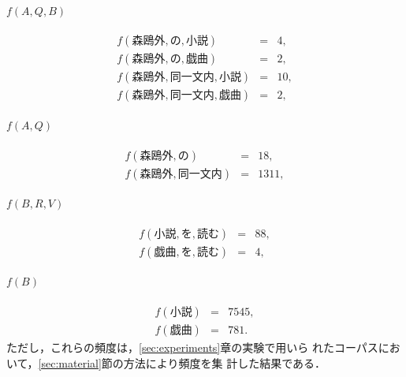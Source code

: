 \paragraph{$f(A,Q,B)$}
\begin{eqnarray}
  f(森鴎外,の,小説) & = & 4, \nonumber\\
  f(森鴎外,の,戯曲) & = & 2, \nonumber\\
  f(森鴎外,同一文内,小説) & = & 10, \nonumber\\
  f(森鴎外,同一文内,戯曲) & = & 2, \nonumber
\end{eqnarray}
\paragraph{$f(A,Q)$}
\begin{eqnarray}
  f(森鴎外,の) & = & 18, \nonumber\\
  f(森鴎外,同一文内) & = & 1311,\nonumber
\end{eqnarray}
\paragraph{$f(B,R,V)$}
\begin{eqnarray}
  f(小説,を,読む) & = & 88, \nonumber\\
  f(戯曲,を,読む) & = & 4, \nonumber
\end{eqnarray}
\paragraph{$f(B)$}
\begin{eqnarray}
  f(小説) & = & 7545,\nonumber\\
  f(戯曲) & = & 781. \nonumber
\end{eqnarray}
ただし，これらの頻度は，\ref{sec:experiments}章の実験で用いら
れたコーパスにおいて，\ref{sec:material}節の方法により頻度を集
計した結果である．

